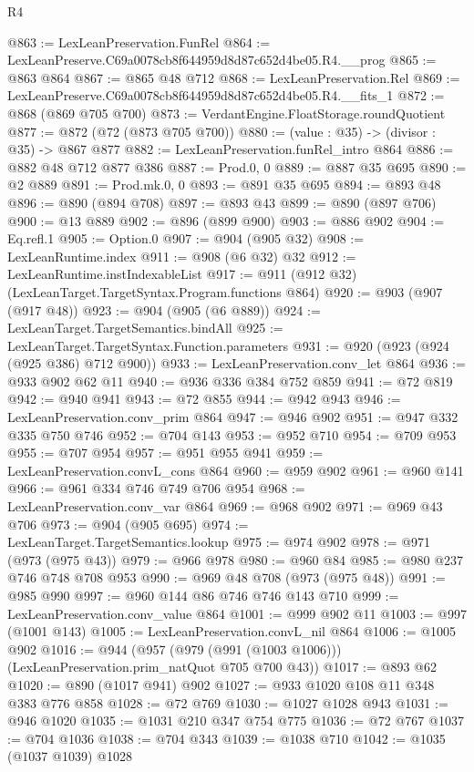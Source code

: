 \begin{lexlean}{R4}
\begin{coremodule}
@863 := LexLeanPreservation.FunRel
@864 := LexLeanPreserve.C69a0078cb8f644959d8d87c652d4be05.R4.__prog
@865 := @863 @864
@867 := @865 @48 @712
@868 := LexLeanPreservation.Rel
@869 := LexLeanPreserve.C69a0078cb8f644959d8d87c652d4be05.R4.__fits_1
@872 := @868 (@869 @705 @700)
@873 := VerdantEngine.FloatStorage.roundQuotient
@877 := @872 (@72 (@873 @705 @700))
@880 := (value : @35) -> (divisor : @35) -> @867 @877
@882 := LexLeanPreservation.funRel_intro @864
@886 := @882 @48 @712 @877 @386
@887 := Prod.{0, 0}
@889 := @887 @35 @695
@890 := @2 @889
@891 := Prod.mk.{0, 0}
@893 := @891 @35 @695
@894 := @893 @48
@896 := @890 (@894 @708)
@897 := @893 @43
@899 := @890 (@897 @706)
@900 := @13 @889
@902 := @896 (@899 @900)
@903 := @886 @902
@904 := Eq.refl.{1}
@905 := Option.{0}
@907 := @904 (@905 @32)
@908 := LexLeanRuntime.index
@911 := @908 (@6 @32) @32
@912 := LexLeanRuntime.instIndexableList
@917 := @911 (@912 @32) (LexLeanTarget.TargetSyntax.Program.functions @864)
@920 := @903 (@907 (@917 @48))
@923 := @904 (@905 (@6 @889))
@924 := LexLeanTarget.TargetSemantics.bindAll
@925 := LexLeanTarget.TargetSyntax.Function.parameters
@931 := @920 (@923 (@924 (@925 @386) @712 @900))
@933 := LexLeanPreservation.conv_let @864
@936 := @933 @902 @62 @11
@940 := @936 @336 @384 @752 @859
@941 := @72 @819
@942 := @940 @941
@943 := @72 @855
@944 := @942 @943
@946 := LexLeanPreservation.conv_prim @864
@947 := @946 @902
@951 := @947 @332 @335 @750 @746
@952 := @704 @143
@953 := @952 @710
@954 := @709 @953
@955 := @707 @954
@957 := @951 @955 @941
@959 := LexLeanPreservation.convL_cons @864
@960 := @959 @902
@961 := @960 @141
@966 := @961 @334 @746 @749 @706 @954
@968 := LexLeanPreservation.conv_var @864
@969 := @968 @902
@971 := @969 @43 @706
@973 := @904 (@905 @695)
@974 := LexLeanTarget.TargetSemantics.lookup
@975 := @974 @902
@978 := @971 (@973 (@975 @43))
@979 := @966 @978
@980 := @960 @84
@985 := @980 @237 @746 @748 @708 @953
@990 := @969 @48 @708 (@973 (@975 @48))
@991 := @985 @990
@997 := @960 @144 @86 @746 @746 @143 @710
@999 := LexLeanPreservation.conv_value @864
@1001 := @999 @902 @11
@1003 := @997 (@1001 @143)
@1005 := LexLeanPreservation.convL_nil @864
@1006 := @1005 @902
@1016 := @944 (@957 (@979 (@991 (@1003 @1006))) (LexLeanPreservation.prim_natQuot @705 @700 @43))
@1017 := @893 @62
@1020 := @890 (@1017 @941) @902
@1027 := @933 @1020 @108 @11 @348 @383 @776 @858
@1028 := @72 @769
@1030 := @1027 @1028 @943
@1031 := @946 @1020
@1035 := @1031 @210 @347 @754 @775
@1036 := @72 @767
@1037 := @704 @1036
@1038 := @704 @343
@1039 := @1038 @710
@1042 := @1035 (@1037 @1039) @1028

\end{coremodule}
\end{lexlean}
